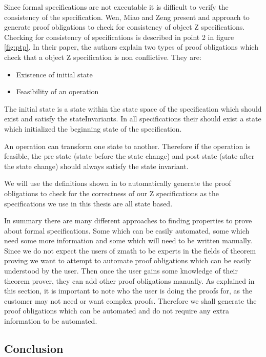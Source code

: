 Since formal specifications are not executable it is difficult to verify the
consistency of the specification. Wen, Miao and Zeng
\cite{DBLP:conf/icsea/WenMZ06} present and approach to generate proof
obligations to check for consistency of object Z specifications. Checking for
consistency of specifications is described in point 2 in figure \ref{fig:ptp}.
In their paper, the authors explain two types of proof obligations which check
that a object Z specification is non conflictive. They are:

\begin{itemize}
\item Existence of initial state

\item Feasibility of an operation
\end{itemize}

The initial state is a state within the state space of the specification which
should exist and satisfy the stateInvariants. In all specifications their should
exist a state which initialized the beginning state of the specification.

An operation can transform one state to another. Therefore if the operation is
feasible, the pre state (state before the state change) and post state (state
after the state change) should always satisfy the state invariant. 

We will use the definitions shown in \cite{DBLP:conf/icsea/WenMZ06} to
automatically generate the proof obligations to check for the correctness of our
Z specifications as the specifications we use in this thesis are all state
based.

In summary there are many different approaches to finding properties to prove
about formal specifications. Some which can be easily automated, some which need
some more information and some which will need to be written manually. Since we
do not expect the users of \gls{zmath} to be experts in the fields of theorem
proving we want to attempt to automate proof obligations which can be easily
understood by the user. Then once the user gains some knowledge of their theorem
prover, they can add other proof obligations manually. As explained in this
section, it is important to note who the user is doing the proofs for, as the
customer may not need or want complex proofs. Therefore we shall generate the
proof obligations which can be automated and do not require any extra
information to be automated.


\subsection{Conclusion}

